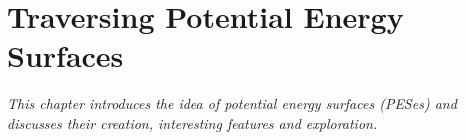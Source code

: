 \chapter{Traversing Potential Energy Surfaces}
\label{chap:pes}

\textit{This chapter introduces the idea of potential energy surfaces (PESes) and discusses their creation, interesting features and exploration.}










